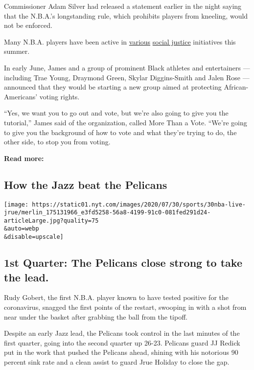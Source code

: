 Commissioner Adam Silver had released a statement earlier in the night
saying that the N.B.A.'s longstanding rule, which prohibits players from
kneeling, would not be enforced.

Many N.B.A. players have been active in
\href{https://www.nytimes.com/2020/06/12/sports/nba-season-restart-black-lives-matter.html}{various}
\href{https://www.nytimes.com/2020/06/01/sports/basketball/george-floyd-nba-protests.html}{social
justice} initiatives this summer.

In early June, James and a group of prominent Black athletes and
entertainers --- including Trae Young, Draymond Green, Skylar
Diggins-Smith and Jalen Rose --- announced that they would be starting a
new group aimed at protecting African-Americans' voting rights.

``Yes, we want you to go out and vote, but we're also going to give you
the tutorial,'' James said of the organization, called More Than a Vote.
``We're going to give you the background of how to vote and what they're
trying to do, the other side, to stop you from voting.

\textbf{Read more:}

\hypertarget{how-the-jazz-beat-the-pelicans}{%
\subsection{How the Jazz beat the
Pelicans}\label{how-the-jazz-beat-the-pelicans}}

\texttt{[image: https://static01.nyt.com/images/2020/07/30/sports/30nba-live-jrue/merlin\_175131966\_e3fd5258-56a8-4199-91c0-081fed291d24-articleLarge.jpg?quality=75\\\&auto=webp\\\&disable=upscale]}

\hypertarget{1st-quarter-the-pelicans-close-strong-to-take-the-lead}{%
\subsection{1st Quarter: The Pelicans close strong to take the
lead.}\label{1st-quarter-the-pelicans-close-strong-to-take-the-lead}}

Rudy Gobert, the first N.B.A. player known to have tested positive for
the coronavirus, snagged the first points of the restart, swooping in
with a shot from near under the basket after grabbing the ball from the
tipoff.

Despite an early Jazz lead, the Pelicans took control in the last
minutes of the first quarter, going into the second quarter up 26-23.
Pelicans guard JJ Redick put in the work that pushed the Pelicans ahead,
shining with his notorious 90 percent sink rate and a clean assist to
guard Jrue Holiday to close the gap.

